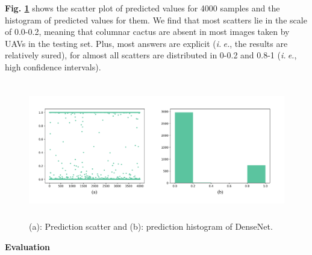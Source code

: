 \documentclass[a4paper]{article}
\begin{document}
\large{

\textbf{Fig. \ref{denseresults}} shows the scatter plot of predicted values for 4000 samples and the histogram of predicted values for them. We find that most scatters lie in the scale of 0.0-0.2, meaning that columnar cactus are absent in most images taken by UAVs in the testing set. Plus, most answers are explicit (\textit{i.$\ $e.}, the results are relatively sured), for almost all scatters are distributed in 0-0.2 and 0.8-1 (\textit{i.$\ $e.}, high confidence intervals).

}

\begin{figure}[h]
\centering
\includegraphics[width=15cm,height=6cm]{dense_best.pdf}
\caption{ (a): Prediction scatter and (b): prediction histogram of \textsf{DenseNet}.}
\label{denseresults}
\end{figure}

\vspace{2mm}
\begin{center}
\large\textbf{Evaluation} \\
\end{center}
\end{document}
